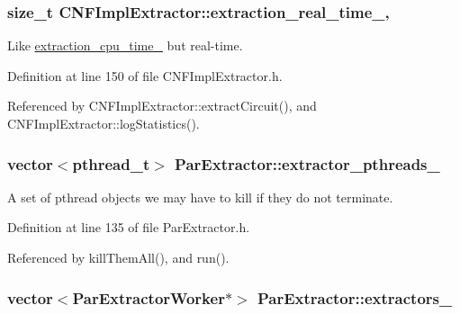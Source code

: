 \hypertarget{classCNFImplExtractor_ae06413cf08f868357d64545b3041aa18}{
\subsubsection[{extraction\-\_\-real\-\_\-time\-\_\-}]{\setlength{\rightskip}{0pt plus 5cm}size\-\_\-t C\-N\-F\-Impl\-Extractor\-::extraction\-\_\-real\-\_\-time\-\_\-\hspace{0.3cm}{\ttfamily [protected]}, {\ttfamily [inherited]}}}\label{classCNFImplExtractor_ae06413cf08f868357d64545b3041aa18}


Like \hyperlink{classCNFImplExtractor_ab8be06d42fd3c4b569ec22cfcf2f508e}{extraction\-\_\-cpu\-\_\-time\-\_\-} but real-\/time. 



Definition at line 150 of file C\-N\-F\-Impl\-Extractor.\-h.



Referenced by C\-N\-F\-Impl\-Extractor\-::extract\-Circuit(), and C\-N\-F\-Impl\-Extractor\-::log\-Statistics().

\hypertarget{classParExtractor_ad6e211ed74c4f35ff4dd1813779e77d3}{
\subsubsection[{extractor\-\_\-pthreads\-\_\-}]{\setlength{\rightskip}{0pt plus 5cm}vector$<$pthread\-\_\-t$>$ Par\-Extractor\-::extractor\-\_\-pthreads\-\_\-\hspace{0.3cm}{\ttfamily [protected]}}}\label{classParExtractor_ad6e211ed74c4f35ff4dd1813779e77d3}


A set of pthread objects we may have to kill if they do not terminate. 



Definition at line 135 of file Par\-Extractor.\-h.



Referenced by kill\-Them\-All(), and run().

\hypertarget{classParExtractor_a16fc72f87a16e8dfbda55fcde4c7483e}{
\subsubsection[{extractors\-\_\-}]{\setlength{\rightskip}{0pt plus 5cm}vector$<${\bf Par\-Extractor\-Worker}$\ast$$>$ Par\-Extractor\-::extractors\-\_\-\hspace{0.3cm}{\ttfamily [protected]}}}\label{classParExtractor_a16fc72f87a16e8dfbda55fcde4c7483e}


